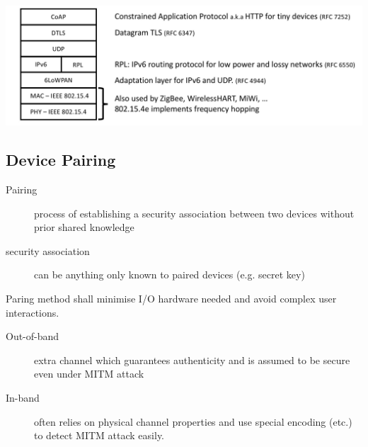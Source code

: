 \begin{center}
    \includegraphics[width=\linewidth]{images/iot_stack}
\end{center}

\subsection{Device Pairing}
\begin{description}
    \item[Pairing] process of establishing a security association between two devices without prior shared knowledge
    \item[security association] can be anything only known to paired devices (e.g. secret key)
\end{description}

Paring method shall minimise I/O hardware needed and avoid complex user interactions.

\begin{description}
    \item[Out-of-band] extra channel which guarantees authenticity and is assumed to be secure even under MITM attack
    \item[In-band] often relies on physical channel properties and use special encoding (etc.) to detect MITM attack easily.
\end{description}
